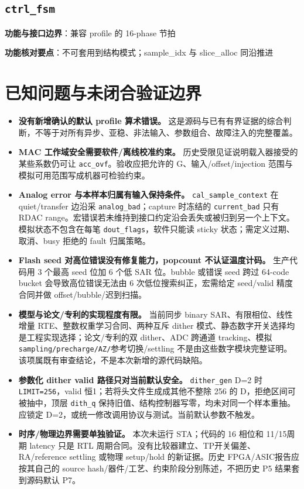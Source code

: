 \documentclass[UTF8,fontset=fandol,10pt,a4paper,openany]{ctexrep}
\newcommand{\code}[1]{\nolinkurl{#1}}
\begin{document}
\subsection*{\code{ctrl_fsm}}
\noindent\textbf{功能与接口边界}：兼容 profile 的 16-phase 节拍\par
\noindent\textbf{功能核对要点}：不可套用到结构模式；sample\_idx 与 slice\_alloc 同沿推进\par


\section{已知问题与未闭合验证边界}


\begin{itemize}
\item \textbf{没有新增确认的默认 profile 算术错误。} 这是源码与已有有界证据的综合判断，不等于对所有异步、亚稳、非法输入、参数组合、故障注入的完整覆盖。
\item \textbf{MAC 工作域安全需要软件/离线校准约束。} 历史受限见证说明载入器接受的某些系数仍可让 \code{acc_ovf}。验收应把允许的 G、输入/offset/injection 范围与模拟可用范围写成机器可检验约束。
\item \textbf{Analog error 与本样本归属有输入保持条件。} \code{cal_sample_context} 在 quiet/transfer 边沿采 \code{analog_bad}；capture 时冻结的 \code{current_bad} 只有 RDAC range。宏错误若未维持到接口约定沿会丢失或被归到另一个上下文。模拟状态不包含在每笔 \code{dout_flags}，软件只能读 sticky 状态；需定义过期、取消、busy 拒绝的 fault 归属策略。
\item \textbf{Flash seed 对高位错误没有修复能力，popcount 不认证温度计码。} 生产代码用 3 个最高 seed 位加 6 个低 SAR 位。bubble 或错误 seed 跨过 64-code bucket 会导致高位错误无法由 6 次低位搜索纠正，宏需给定 seed/valid 精度合同并做 offset/bubble/迟到扫描。
\item \textbf{模型与论文/专利的实现程度有限。} 当前同步 binary SAR、有限相位、线性增量 RTE、整数权重学习合同、两种互斥 dither 模式、静态数字开关选择均是工程实现选择；论文/专利的双 dither、ADC 跨通道 tracking、模拟 \code{sampling/precharge/AZ/}参考切换/settling 不是由这些数字模块完整证明。该项属既有审查结论，不是本次新增的源代码缺陷。
\item \textbf{参数化 dither valid 路径只对当前默认安全。} \code{dither_gen} D=2 时 \code{LIMIT=256}，valid 恒1；若将头文件生成成其他不整除 256 的 D，拒绝区间可被抽中，顶层 \code{dith_q} 保持旧值、结构控制器写零，均未对同一个样本重抽。应锁定 D=2，或统一修改调用协议与测试。当前默认参数不触发。
\item \textbf{时序/物理边界需要单独验证。} 本次未运行 STA；代码的 16 相位和 11/15周期 latency 只是 RTL 周期合同。没有比较器建立、TP开关偏差、RA/reference settling 或物理 setup/hold 的新证据。历史 FPGA/ASIC报告应按其自己的 source hash/器件/工艺、约束阶段分别陈述，不把历史 P5 结果套到源码默认 P7。
\end{itemize}
\end{document}
